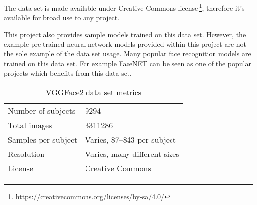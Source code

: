 The data set is made available under Creative Commons license\,\footnote{\url{https://creativecommons.org/licenses/by-sa/4.0/}}, therefore it's available for broad use to any project.

This project also provides sample models trained on this data set. However, the example pre-trained neural network models provided within this project are not the sole example of the data set usage. Many popular face recognition models are trained on this data set. For example FaceNET can be seen as one of the popular projects which benefits from this data set.

\begin{table}[ht]
    \centering
    \caption{VGGFace2 data set metrics}

    \begin{tabularx}{0.75\textwidth}{l|l}
        \toprule
        Number of subjects & \num{9294} \\
        Total images & \num{3311286} \\
        Samples per subject & Varies, 87--843 per subject \\
        Resolution & Varies, many different sizes \\
        License & Creative Commons \\
        \bottomrule
    \end{tabularx}
\end{table}
